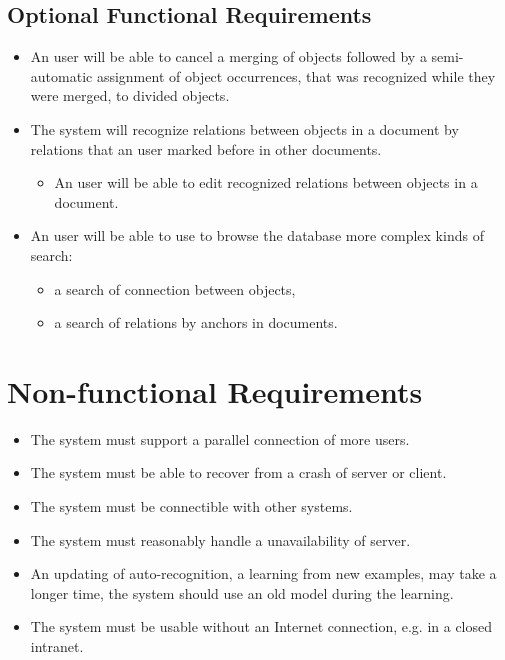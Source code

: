 \subsection{Optional Functional Requirements}
\begin{itemize}
	\item An user will be able to cancel a merging of objects followed by
	a semi-automatic assignment of object occurrences, that was recognized while
	they were merged, to divided objects.
	\item The system will recognize relations between objects in a document by
	relations that an user marked before in other documents.
	\begin{itemize}
		\item An user will be able to edit recognized relations between objects
		in a document.
	\end{itemize}
	\item An user will be able to use to browse the database more complex kinds
	of search:
	\begin{itemize}
		\item a search of connection between objects,
		\item a search of relations by anchors in documents.
	\end{itemize}
\end{itemize}

\section{Non-functional Requirements}
\begin{itemize}
	\item The system must support a parallel connection of more users.
	\item The system must be able to recover from a crash of server or client.
	\item The system must be connectible with other systems.
	\item The system must reasonably handle a unavailability of server.
	\item An updating of auto-recognition, a learning from new examples,  may take
	a longer time, the system should use an old model during the learning.
	\item The system must be usable without an Internet connection, e.g. in
	a closed intranet.
\end{itemize}

